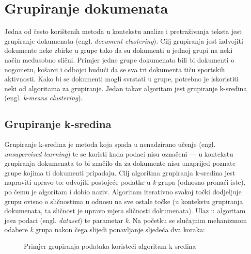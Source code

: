 \documentclass[times, utf8, zavrsni]{fer}
\begin{document}
\section{Grupiranje dokumenata}
Jedna od često korištenih metoda u kontekstu analize i pretraživanja teksta jest grupiranje dokumenata (engl. \textit{document clustering}). Cilj grupiranja jest izdvojiti dokumente neke zbirke u grupe tako da su dokumenti u jednoj grupi na neki način međusobno slični. Primjer jedne grupe dokumenata bili bi dokumenti o nogometu, košarci i odbojci budući da se sva tri dokumenta tiču sportskih aktivnosti. Kako bi se dokumenti mogli svrstati u grupe, potrebno je iskoristiti neki od algoritama za grupiranje. Jedan takav algoritam jest grupiranje k-sredina (engl. \textit{k-means clustering}).

\subsection{Grupiranje k-sredina}
\label{k_means_clustering}
Grupiranje k-sredina je metoda koja spada u nenadzirano učenje (engl. \textit{unsupervised learning}) te se koristi kada podaci nisu označeni — u kontekstu grupiranja dokumenata to bi značilo da za dokumente nisu unaprijed poznate grupe kojima ti dokumenti pripadaju. Cilj algoritma grupiranja k-sredina jest napraviti upravo to: odvojiti postojeće podatke u \textit{k} grupa (odnosno pronaći iste), po čemu je algoritam i dobio naziv. Algoritam iterativno svakoj točki dodjeljuje grupu ovisno o sličnostima u odnosu na sve ostale točke (u kontekstu grupiranja dokumenata, ta sličnost je upravo mjera sličnosti dokumenata).
Ulaz u algoritam jesu podaci (engl. \textit{dataset}) te parametar \textit{k}.
Na početku se slučajnim mehanizmom odabere \textit{k} grupa nakon čega slijedi ponavljanje sljedeća dva koraka:

\begin{figure}[h]
\centering    
\def\svgwidth{\columnwidth}

\caption{Primjer grupiranja podataka koristeći algoritam k-sredina}
\label{img:clustering}
\end{figure}
\end{document}

